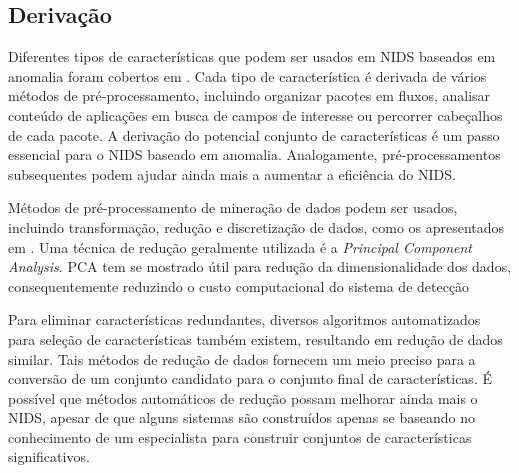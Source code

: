 \subsection{Derivação}
Diferentes tipos de características que podem ser usados em NIDS baseados em anomalia foram cobertos em \cite{davis11}.
Cada tipo de característica é derivada de vários métodos de pré-processamento, incluindo organizar pacotes em fluxos,
analisar conteúdo de aplicações em busca de campos de interesse ou percorrer cabeçalhos de cada pacote. A derivação do
potencial conjunto de características é um passo essencial para o NIDS baseado em anomalia. Analogamente,
pré-processamentos subsequentes podem ajudar ainda mais a aumentar a eficiência do NIDS.
\par Métodos de pré-processamento de mineração de dados podem ser usados, incluindo transformação, redução e
discretização de dados, como os apresentados em \cite{ribeiro08}. Uma técnica de redução geralmente utilizada é a
\textit{Principal Component Analysis}. PCA tem se mostrado útil para redução da dimensionalidade dos dados,
consequentemente reduzindo o custo computacional do sistema de detecção
\par Para eliminar características redundantes, diversos algoritmos automatizados para seleção de características
também existem, resultando em redução de dados similar. Tais métodos de redução de dados fornecem um meio preciso para
a conversão de um conjunto candidato para o conjunto final de características. É possível que métodos automáticos de
redução possam melhorar ainda mais o NIDS, apesar de que alguns sistemas são construídos apenas se baseando no
conhecimento de um especialista para construir conjuntos de características significativos.

